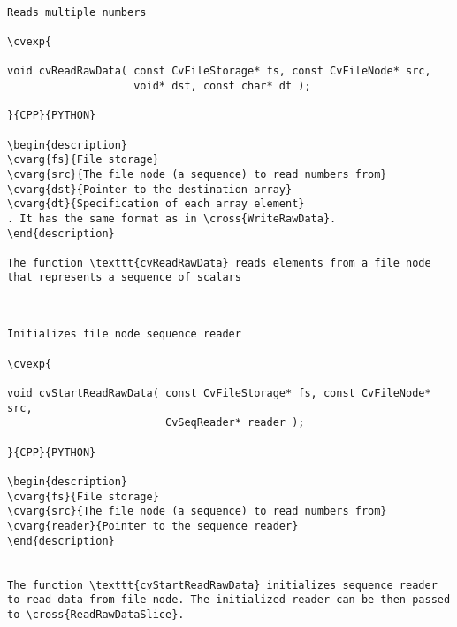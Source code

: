 \begin{verbatim}

Reads multiple numbers

\cvexp{

void cvReadRawData( const CvFileStorage* fs, const CvFileNode* src,
                    void* dst, const char* dt );

}{CPP}{PYTHON}

\begin{description}
\cvarg{fs}{File storage}
\cvarg{src}{The file node (a sequence) to read numbers from}
\cvarg{dst}{Pointer to the destination array}
\cvarg{dt}{Specification of each array element}
. It has the same format as in \cross{WriteRawData}.
\end{description}

The function \texttt{cvReadRawData} reads elements from a file node that represents a sequence of scalars


\end{verbatim}
\begin{verbatim}

Initializes file node sequence reader

\cvexp{

void cvStartReadRawData( const CvFileStorage* fs, const CvFileNode* src,
                         CvSeqReader* reader );

}{CPP}{PYTHON}

\begin{description}
\cvarg{fs}{File storage}
\cvarg{src}{The file node (a sequence) to read numbers from}
\cvarg{reader}{Pointer to the sequence reader}
\end{description}


The function \texttt{cvStartReadRawData} initializes sequence reader to read data from file node. The initialized reader can be then passed to \cross{ReadRawDataSlice}.


\end{verbatim}
